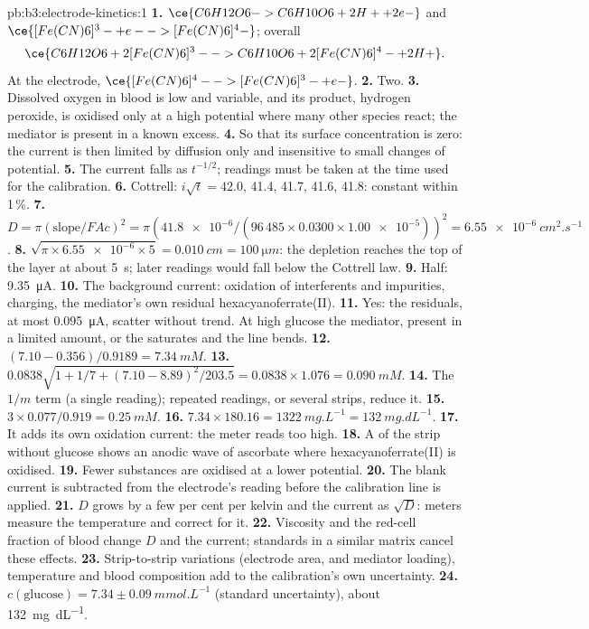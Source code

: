 \begin{solution}{pb:b3:electrode-kinetics:1}
\textbf{1.} $\ce{C6H12O6 -> C6H10O6 + 2 H+ + 2 e-}$ and $\ce{[Fe(CN)6]^3- + e- -> [Fe(CN)6]^4-}$;
overall
\[
  \ce{C6H12O6 + 2 [Fe(CN)6]^3- -> C6H10O6 + 2 [Fe(CN)6]^4- + 2 H+} .
\]
At the electrode, $\ce{[Fe(CN)6]^4- -> [Fe(CN)6]^3- + e-}$.
\textbf{2.} Two.
\textbf{3.} Dissolved oxygen in blood is low and variable, and its product,
hydrogen peroxide, is oxidised only at a high potential where many other
species react; the mediator is present in a known excess.
\textbf{4.} So that its surface concentration is zero: the current is then limited
by diffusion only and insensitive to small changes of potential.
\textbf{5.} The current falls as $t^{-1/2}$; readings must be taken at the time used for the
calibration.
\textbf{6.} Cottrell: $i\sqrt t = 42.0$, 41.4, 41.7, 41.6, 41.8: constant within 1\,\%.
\textbf{7.} $D = \pi(\text{slope}/FAc)^2 = \pi(\num{41.8e-6}/(96\,485 \times 0.0300 \times \num{1.00e-5}))^2 = \qty{6.55e-6}{cm^2.s^{-1}}$.
\textbf{8.} $\sqrt{\pi \times \num{6.55e-6} \times 5} = \qty{0.010}{cm} = \qty{100}{\micro m}$: the depletion reaches the top of
the layer at about \qty{5}{s}; later readings would fall below the Cottrell law.
\textbf{9.} Half: \qty{9.35}{\micro A}.
\textbf{10.} The background current: oxidation of interferents and impurities,
charging, the mediator's own residual hexacyanoferrate(II).
\textbf{11.} Yes: the residuals, at most \qty{0.095}{\micro A}, scatter without trend. At high glucose the mediator, present in
a limited amount, or the  saturates and the line bends.
\textbf{12.} $(7.10 - 0.356)/0.9189 = \qty{7.34}{mM}$.
\textbf{13.} $0.0838\sqrt{1 + 1/7 + (7.10 - 8.89)^2/203.5} = 0.0838 \times 1.076 = \qty{0.090}{mM}$.
\textbf{14.} The $1/m$ term (a single reading); repeated readings, or several strips,
reduce it.
\textbf{15.} $3 \times 0.077/0.919 = \qty{0.25}{mM}$.
\textbf{16.} $7.34 \times 180.16 = \qty{1322}{mg.L^{-1}} = \qty{132}{mg.dL^{-1}}$.
\textbf{17.} It adds its own oxidation current: the meter reads too high.
\textbf{18.} A  of the strip without glucose shows an anodic wave of
ascorbate where hexacyanoferrate(II) is oxidised.
\textbf{19.} Fewer substances are oxidised at a lower potential.
\textbf{20.} The blank current is subtracted from the  electrode's reading
before the calibration line is applied.
\textbf{21.} $D$ grows by a few per cent per kelvin and the current as $\sqrt D$: meters measure
the temperature and correct for it.
\textbf{22.} Viscosity and the red-cell fraction of blood change $D$ and the current;
standards in a similar matrix cancel these effects.
\textbf{23.} Strip-to-strip variations (electrode area,  and mediator loading),
temperature and blood composition add to the calibration's own uncertainty.
\textbf{24.} \textbf{$c(\text{glucose}) = 7.34 \pm \qty{0.09}{mmol.L^{-1}}$} (standard uncertainty), about \qty{132}{mg.dL^{-1}}.
\end{solution}

